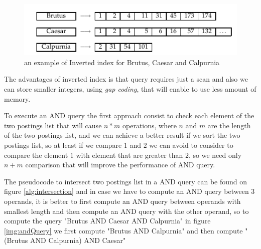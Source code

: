 \begin{figure}
    \caption{an example of Inverted index for Brutus, Caesar and Calpurnia}
    \label{img:invertedIndex}
    \includegraphics[width=\textwidth]{Images/invertedIndex}
\end{figure}
The advantages of inverted index is that query requires just a scan and also we can store smaller integers,
using \emph{gap coding}, that will enable to use less amount of memory.

To execute an AND query the first approach consist to check each element of the two postings list that will cause 
$n * m$ operations, where $n$ and $m$ are the length of the two postings list, and we can achieve a better result
if we sort the two postings list, so at least if we compare $1$ and $2$ we can avoid to consider to compare the
element $1$ with element that are greater than $2$, so we need only $n + m$ comparison that will improve the
performance of AND query.


The pseudocode to intersect two postings list in a AND query can be found on figure \ref{alg:intersection} and
in case we have to compute an AND query between 3 operands, it is better to first compute an AND query between
operands with smallest length and then compute an AND query with the other operand, so to compute the 
query "Brutus AND Caesar AND Calpurnia" in figure \ref{img:andQuery} we first compute "Brutus AND Calpurnia" and
then compute "(Brutus AND Calpurnia) AND Caesar"

